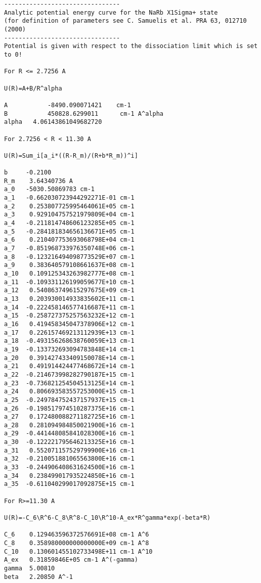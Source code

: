 \begin{lstlisting}
--------------------------------
Analytic potential energy curve for the NaRb X1Sigma+ state
(for definition of parameters see C. Samuelis et al. PRA 63, 012710 (2000) 
--------------------------------
Potential is given with respect to the dissociation limit which is set to 0!

For R <= 2.7256 A

U(R)=A+B/R^alpha

A           -8490.090071421    cm-1
B           450828.6299011      cm-1 A^alpha 
alpha   4.06143861049682720

For 2.7256 < R < 11.30 A

U(R)=Sum_i[a_i*((R-R_m)/(R+b*R_m))^i]

b     -0.2100
R_m    3.64340736 A
a_0   -5030.50869783 cm-1
a_1   -0.662030723944292271E-01 cm-1
a_2    0.253807725995464061E+05 cm-1
a_3    0.929104757521979809E+04 cm-1
a_4   -0.211814748606123285E+05 cm-1
a_5   -0.284181834656136671E+05 cm-1
a_6    0.210407753693068798E+04 cm-1
a_7   -0.851968733976350748E+06 cm-1
a_8   -0.123216494098773529E+07 cm-1
a_9    0.383640579108661637E+08 cm-1
a_10   0.109125343263982777E+08 cm-1
a_11  -0.109331126199059677E+10 cm-1
a_12   0.540863749615297675E+09 cm-1
a_13   0.203930014933835602E+11 cm-1
a_14  -0.222458146577416687E+11 cm-1
a_15  -0.258727375257563232E+12 cm-1
a_16   0.419458345047378906E+12 cm-1
a_17   0.226157469213112939E+13 cm-1
a_18  -0.493156268638760059E+13 cm-1
a_19  -0.133732693094783848E+14 cm-1
a_20   0.391427433409150078E+14 cm-1
a_21   0.491914424477468672E+14 cm-1
a_22  -0.214673998282790187E+15 cm-1
a_23  -0.736821254504513125E+14 cm-1
a_24   0.806693583557253000E+15 cm-1
a_25  -0.249784752437157937E+15 cm-1
a_26  -0.198517974510287375E+16 cm-1
a_27   0.172480088271182725E+16 cm-1
a_28   0.281094984850021900E+16 cm-1
a_29  -0.441448085841028300E+16 cm-1
a_30  -0.122221795646213325E+16 cm-1
a_31   0.552071157529799900E+16 cm-1
a_32  -0.210051881065563800E+16 cm-1
a_33  -0.244906408631624500E+16 cm-1
a_34   0.238499017935224850E+16 cm-1
a_35  -0.611040299017092875E+15 cm-1

For R>=11.30 A

U(R)=-C_6\R^6-C_8\R^8-C_10\R^10-A_ex*R^gamma*exp(-beta*R)

C_6    0.129463596372576691E+08 cm-1 A^6
C_8    0.358980000000000000E+09 cm-1 A^8
C_10   0.130601455102733498E+11 cm-1 A^10
A_ex   0.31859846E+05 cm-1 A^(-gamma)
gamma  5.00810   
beta   2.20850 A^-1
\end{lstlisting}


